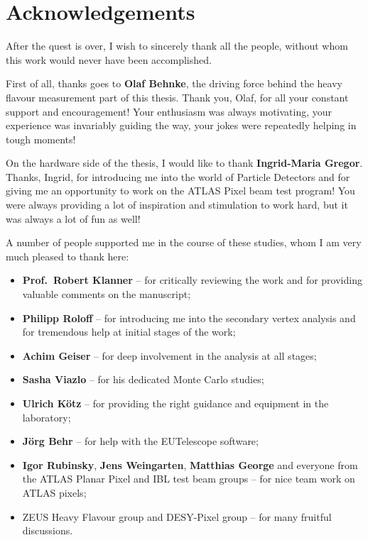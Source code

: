 \thispagestyle{empty}
\vspace{-3cm}
\section*{\centering Acknowledgements}
\bigskip
After the quest is over, I wish to sincerely thank all the people,
without whom this work would never have been accomplished.

\smallskip
First of all, thanks goes to {\bf Olaf Behnke}, the driving force behind the heavy flavour measurement part of this thesis.
Thank you, Olaf, for all your constant support and encouragement!
Your enthusiasm was always motivating, your experience was invariably guiding the way, your jokes were repeatedly helping in tough moments!

\smallskip
On the hardware side of the thesis, I would like to thank {\bf Ingrid-Maria Gregor}.
Thanks, Ingrid, for introducing me into the world of Particle Detectors and for giving me an opportunity to work on the ATLAS Pixel beam test program!
You were always providing a lot of inspiration and stimulation to work hard, but it was always a lot of fun as well!

\smallskip
A number of people supported me in the course of these studies, whom I am very much pleased to thank here:
\begin{itemize}
 \item {\bf Prof.~Robert Klanner} -- for critically reviewing the work and for providing valuable comments on the manuscript;
 \item {\bf Philipp Roloff} -- for introducing me into the secondary vertex analysis and for tremendous help at initial stages of the work;
 \item {\bf Achim Geiser} -- for deep involvement in the analysis at all stages;
 \item {\bf Sasha Viazlo} -- for his dedicated Monte Carlo studies;
 \item {\bf Ulrich K\"otz} -- for providing the right guidance and equipment in the laboratory;
 \item {\bf J\"org Behr} -- for help with the EUTelescope software;
 \item {\bf Igor Rubinsky}, {\bf Jens Weingarten}, {\bf Matthias George} and everyone from the ATLAS Planar Pixel and IBL test beam groups -- for nice team work on ATLAS pixels;
 \item ZEUS Heavy Flavour group and DESY-Pixel group -- for many fruitful discussions.
\end{itemize}

